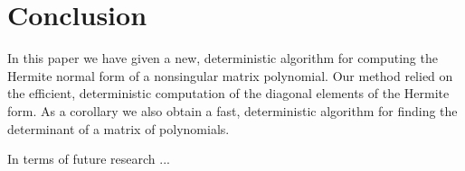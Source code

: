 
\section{Conclusion\label{sec:Future-Research}}

In this paper we have given a new, deterministic algorithm for computing
the Hermite normal form of a nonsingular matrix polynomial. Our method
relied on the efficient, deterministic computation of the diagonal
elements of the Hermite form. As a corollary we also obtain a fast,
deterministic algorithm for finding the determinant of a matrix of
polynomials.

In terms of future research ... 
